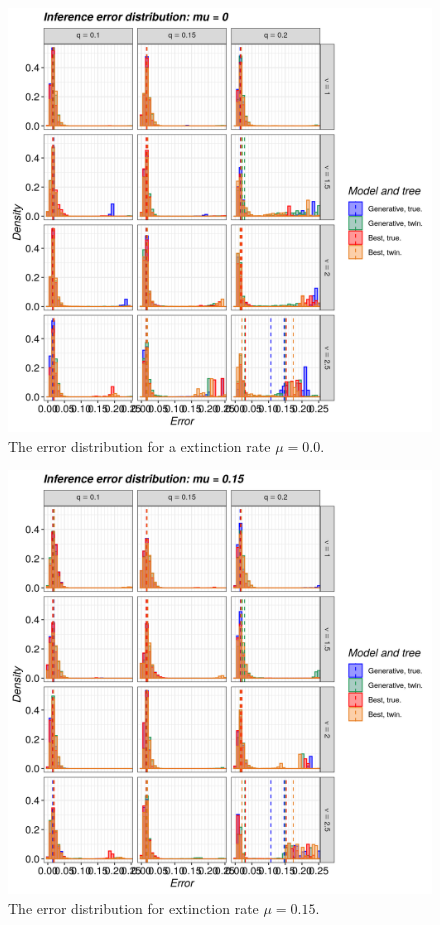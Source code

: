 \begin{figure}[!htbp]
  \includegraphics[width=\textwidth]{20190905_figure_1a.png}
  \caption{
    The error distribution for a extinction rate $\mu = 0.0$.
  }
  \label{fig:errors_yule}
\end{figure}

\begin{figure}[!htbp]
  \includegraphics[width=\textwidth]{20190905_figure_1b.png}
  \caption{
    The error distribution for extinction rate $\mu = 0.15$.
  }
  \label{fig:errors_bd}
\end{figure}

